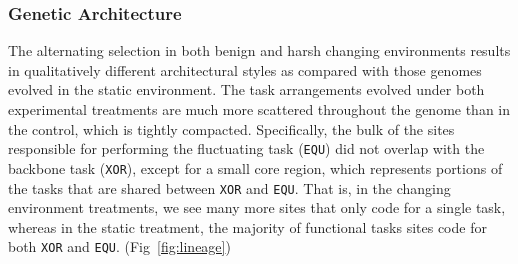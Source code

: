 \documentclass[PhD]{msu-thesis}
\begin{document}
\subsubsection{Genetic Architecture}
The alternating selection in both benign and harsh changing environments results in qualitatively different architectural styles as compared with those genomes evolved in the static environment. The task arrangements evolved under both experimental treatments are much more scattered throughout the genome than in the control, which is tightly compacted. Specifically, the bulk of the sites responsible for performing the fluctuating task (\texttt{EQU}) did not overlap with the backbone task (\texttt{XOR}), except for a small core region, which represents portions of the tasks that are shared between \texttt{XOR} and \texttt{EQU}. That is, in the changing environment treatments, we see many more sites that only code for a single task, whereas in the static treatment, the majority of functional tasks sites code for both \texttt{XOR} and \texttt{EQU}.  (Fig~\ref{fig:lineage})
\end{document}
